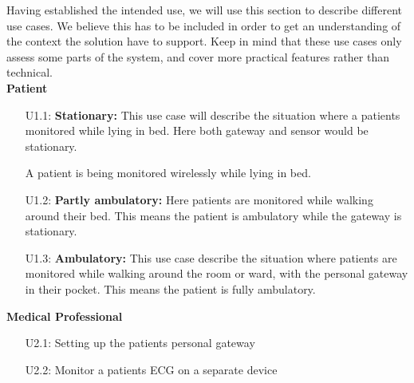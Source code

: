 Having established the intended use, we will use this section to describe different use cases. We believe this has to be included in order to get an understanding of the context the solution have to support. Keep in mind that these use cases only assess some parts of the system, and cover more practical features rather than technical.
\\
\newline
\noindent
\textbf{Patient}
\begin{enumerate}

  \item[\textsc{U1.1}:]\textbf{Stationary:} This use case will describe the situation where a patients monitored while lying in bed. Here both gateway and sensor would be stationary.
  
  A patient is being monitored wirelessly while lying in bed.
  

  \item[\textsc{U1.2}:]\textbf{Partly ambulatory:} Here patients are monitored while walking around their bed. This means the patient is ambulatory while the gateway is stationary.

  \item[\textsc{U1.3}:]\textbf{Ambulatory:} This use case describe the situation where patients are monitored while walking around the room or ward, with the personal gateway in their pocket. This means the patient is fully ambulatory.

\end{enumerate}

\noindent
\textbf{Medical Professional}
\begin{enumerate}

  \item[\textsc{U2.1}:] Setting up the patients personal gateway
  \item[\textsc{U2.2}:] Monitor a patients ECG on a separate device

\end{enumerate}


\newline

